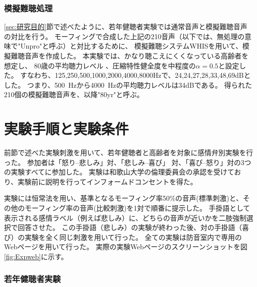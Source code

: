 



\subsubsection{模擬難聴処理}

\ref{sec:研究目的}節で述べたように、若年健聴者実験では通常音声と模擬難聴音声の対比を行う。
モーフィングで合成した上記の210音声（以下では、無処理の意味で"Unpro"と呼ぶ）と対比するために、
模擬難聴システムWHIS\cite{irino2023hearing}を用いて、模擬難聴音声を作成した。
本実験では、かなり聴こえにくくなっている高齢者を想定し、
80歳の平均聴力レベル \cite{tsuiki2002nihon_Jpn}、圧縮特性健全度を中程度の$\alpha=0.5$と設定した。
すなわち、125,250,500,1000,2000,4000,8000Hzで、24,24,27,28,33,48,69dBとした。
つまり、500~Hzから4000~Hzの平均聴力レベルは34dBである。
得られた210個の模擬難聴音声を、以降"80yr"と呼ぶ。


\newpage
\section{実験手順と実験条件}
\label{sec:ExpCondition}
前節で述べた実験刺激を用いて、若年健聴者と高齢者を対象に感情弁別実験を行った。
参加者は「怒り--悲しみ」対、「悲しみ--喜び」 対、「喜び--怒り」対の3つの実験すべてに参加した。
実験は和歌山大学の倫理委員会の承認を受けており、実験前に説明を行ってインフォームドコンセントを得た。

実験には恒常法を用い、基準となるモーフィング率50\%の音声(標準刺激)と、その他のモーフィング率の音声(比較刺激)を1対で順番に提示した。
手掛語として表示される感情ラベル（例えば悲しみ）に、どちらの音声が近いかを二肢強制選択で回答させた。
この手掛語（悲しみ）の実験が終わった後、対の手掛語（喜び）の実験を全く同じ刺激を用いて行った。
全ての実験は防音室内で専用のWebページ\cite{AMLAB_WebOpen}を用いて行った。
実際の実験Webページのスクリーンショットを図\ref{fig:Expweb}に示す。


\subsubsection{若年健聴者実験}

